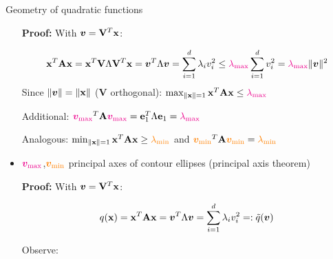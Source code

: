 \documentclass[11pt,compress,t,notes=noshow, xcolor=table]{beamer}
\begin{document}
\begin{vbframe}{Geometry of quadratic functions}
\begin{itemize}
        \vspace{0.25\baselineskip}
    
        \begin{footnotesize}
            \textbf{Proof:} With $\bm{v}=\mathbf{V}^T\mathbf{x}$:

            \vspace{-\baselineskip}
            
            \begin{equation*}
                \mathbf{x}^T\mathbf{A}\mathbf{x} = \mathbf{x}^T\mathbf{V}\Lambda\mathbf{V}^T\mathbf{x} = \bm{v}^T\Lambda\bm{v} = \sum_{i=1}^d \lambda_iv_i^2 \leq \textcolor{magenta}{\lambda_\text{max}} \sum_{i=1}^d v_i^2 = \textcolor{magenta}{\lambda_\text{max}}\|\bm{v}\|^2
            \end{equation*}
            Since $\|\bm{v}\| = \|\mathbf{x}\|$ ($\mathbf{V}$ orthogonal): $\max_{\|\mathbf{x}\|=1} \mathbf{x}^T\mathbf{A}\mathbf{x} \leq \textcolor{magenta}{\lambda_\text{max}}$
            
            Additional: $\textcolor{magenta}{\bm{v}_\text{max}}^T\mathbf{A}\textcolor{magenta}{\bm{v}_\text{max}} = \mathbf{e}_1^T\Lambda\mathbf{e}_1 = \textcolor{magenta}{\lambda_\text{max}}$

            Analogous: $\min_{\|\mathbf{x}\|=1} \mathbf{x}^T \mathbf{A} \mathbf{x} \geq \textcolor{orange}{\lambda_\text{min}}$ and $\textcolor{orange}{\bm{v}_\text{min}}^T\mathbf{A}\textcolor{orange}{\bm{v}_\text{min}} = \textcolor{orange}{\lambda_\text{min}}$
        \end{footnotesize}

    \medskip

    \item $\textcolor{magenta}{\bm{v}_\text{max}}$,$\textcolor{orange}{\bm{v}_\text{min}}$ principal axes of contour ellipses (principal axis theorem)

        \vspace{0.25\baselineskip}
    
        \begin{footnotesize}
            \textbf{Proof:} With $\bm{v}=\mathbf{V}^T\mathbf{x}$:

            \vspace{-0.5\baselineskip}

            \begin{equation*}
                q(\mathbf{x}) = \mathbf{x}^T\mathbf{A}\mathbf{x} = \bm{v}^T\Lambda\bm{v} = \sum_{i=1}^d \lambda_iv_i^2 =: \tilde{q}(\bm{v})
            \end{equation*}

            Observe:


\end{footnotesize}
\end{itemize}
\end{vbframe}
\end{document}
